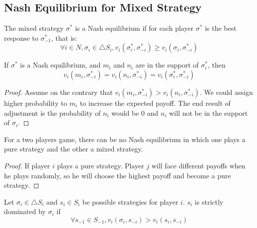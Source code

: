 \subsection{Nash Equilibrium for Mixed Strategy}

\begin{definition}
    The mixed strategy $\sigma^*$ is a Nash equilibrium if for each player $\sigma^*$ is the best response to $\sigma^*_{-1}$, that is:
    \begin{equation*}
        \forall i \in N, \sigma_i \in \bigtriangleup S_i, v_i(\sigma_i^*, \sigma_{-i}^*) \geq v_i(\sigma_i, \sigma_{-i}^*)
    \end{equation*}
\end{definition}

\begin{theorem}
    If $\sigma^*$ is a Nash equilibrium, and $m_i$ and $n_i$ are in the support of $\sigma_i^*$, then
    \begin{equation*}
        v_i (m_i, \sigma_{-i}^*) = v_i (n_i, \sigma_{-i}^*) = v_i (\sigma_i^*, \sigma_{-i}^*)
    \end{equation*}
\end{theorem}
\begin{proof}
    Assume on the contrary that $v_i (m_i, \sigma_{-i}^*) > v_i (n_i, \sigma_{-i}^*)$. We could assign higher probability to $m_i$ to increase the expected payoff. The end result of adjustment is the probability of $n_i$ would be $0$ and $n_i$ will not be in the support of $\sigma_i$.
\end{proof}

\begin{theorem}
    For a two players game, there can be no Nash equilibrium in which one plays a pure strategy and the other a mixed strategy.    
\end{theorem}
\begin{proof}
    If player $i$ plays a pure strategy. Player $j$ will face different payoffs when he plays randomly, so he will choose the highest payoff and become a pure strategy.
\end{proof}

\begin{definition}
    Let $\sigma_i \in \bigtriangleup S_i$ and $s_i \in S_i$ be possible strategies for player $i$. $s_i$ is strictly dominated by $\sigma_i$ if 
    \begin{equation*}
        \forall s_{-1} \in S_{-1}, v_i (\sigma_i, s_{-i}) > v_i (s_i, s_{-i})
    \end{equation*}
\end{definition}

